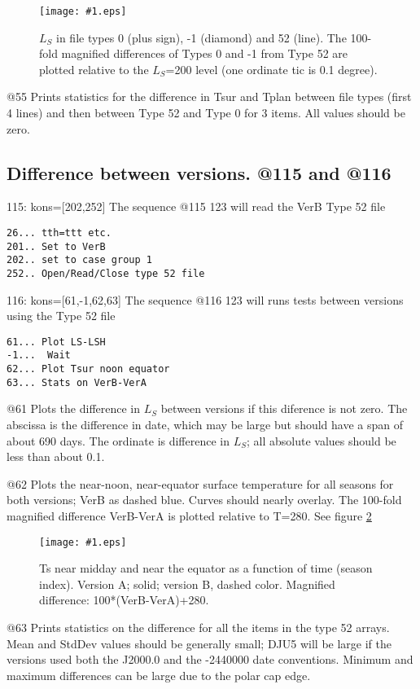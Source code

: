 \documentclass{article}  %
\newcommand{\igc}[1]{\texttt{[image: \#1.eps]}}
\begin{document}
\begin{figure}[!ht] \igc{p53}
\caption[Diurnal Mean Ts] {$L_S$ in file types 0 (plus sign), -1 (diamond) and 52 (line).  The 100-fold magnified differences of Types 0 and -1 from Type 52  are plotted relative to the $L_S$=200 level (one ordinate tic is 0.1 degree).
\label{p53} } \end{figure}


@55 Prints statistics for the difference in Tsur and Tplan between file types (first 4 lines) and then between Type 52 and Type 0 for 3 items. All values should be zero.

\subsection{Difference between versions. @115 and @116} %
115: kons=[202,252]   The sequence @115 123 will read the VerB Type 52 file
\vspace{-3.mm} 
\begin{verbatim}
26... tth=ttt etc.
201.. Set to VerB
202.. set to case group 1
252.. Open/Read/Close type 52 file
\end{verbatim}

116: kons=[61,-1,62,63]  The sequence @116 123 will runs tests between versions using the Type 52 file
\vspace{-3.mm} 
\begin{verbatim}
61... Plot LS-LSH
-1...  Wait
62... Plot Tsur noon equator
63... Stats on VerB-VerA
\end{verbatim}
@61 Plots the difference in $L_S$ between versions if this diference is not zero. The abscissa is the difference in date, which may be large but should have a span of about 690 days. The ordinate is difference in $L_S$;  all absolute values should be less than about 0.1. 

@62 Plots the near-noon, near-equator surface temperature for all seasons for
both versions; VerB as dashed blue. Curves should nearly overlay. The 100-fold
magnified difference VerB-VerA is plotted relative to T=280. See figure
\ref{p62}

\begin{figure}[!ht] \igc{p62}
\caption[Seasonal Equator Noon] {Ts near midday and near the equator as a
  function of time (season index). Version A; solid; version B, dashed
  color. Magnified difference: 100*(VerB-VerA)+280.
\label{p62} } \end{figure}

@63 Prints statistics on the difference for all the items in the type 52
arrays. Mean and StdDev values should be generally small; DJU5 will be large if
the versions used both the J2000.0 and the -2440000 date conventions. Minimum
and maximum differences can be large due to the polar cap edge.
\end{document}
